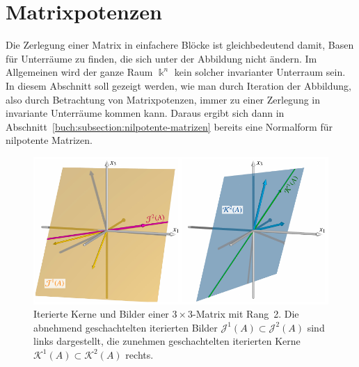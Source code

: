 %
%
%
\section{Matrixpotenzen
\label{buch:section:grundlagen}}
Die Zerlegung einer Matrix in einfachere Blöcke ist gleichbedeutend
damit, Basen für Unterräume zu finden, die sich unter der Abbildung
nicht ändern.
Im Allgemeinen wird der ganze Raum $\Bbbk^n$ kein solcher invarianter
Unterraum sein.
In diesem Abschnitt soll gezeigt werden, wie man durch Iteration
der Abbildung, also durch Betrachtung von Matrixpotenzen, immer zu
%
einer Zerlegung in invariante Unterräume kommen kann.
%
%
Daraus ergibt sich dann in Abschnitt~\ref{buch:subsection:nilpotente-matrizen}
bereits eine Normalform für nilpotente Matrizen.
%

\begin{figure}
\centering
\includegraphics[width=\textwidth]{chapters/40-eigenwerte/images/kernbild.pdf}
\caption{Iterierte Kerne und Bilder einer $3\times 3$-Matrix mit Rang~2.
Die abnehmend geschachtelten iterierten Bilder
$\mathcal{J}^1(A) \subset \mathcal{J}^2(A)$
sind links dargestellt, die zunehmen geschachtelten iterierten Kerne
$\mathcal{K}^1(A) \subset \mathcal{K}^2(A)$ rechts.
\label{buch:eigenwerte:img:kernbild}}
\end{figure}

